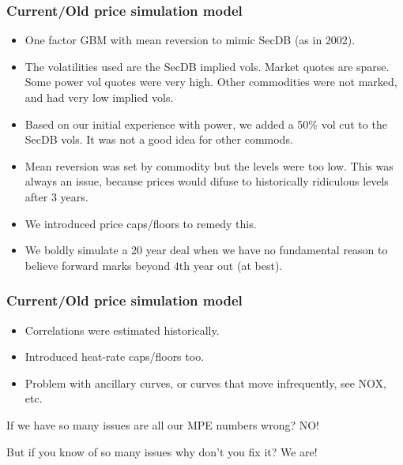 \documentclass[10pt]{beamer}
\begin{document}
\frame
{
  \frametitle{Current/Old price simulation model}
\begin{itemize}
\item One factor GBM with mean reversion to mimic SecDB (as in 2002). 
\item The volatilities used are the SecDB implied vols. Market quotes 
  are sparse.  Some power vol quotes were very high.  Other
  commodities were not marked, and had very low implied vols.   
\item Based on our initial experience with power, we added a 50$\%$ vol
  cut to the SecDB vols.  It was not a good idea for other commods. 
\item Mean reversion was set by commodity but the levels were too
  low.  This was always an issue, because prices
  would difuse to historically ridiculous levels after 3 years. 
\item We introduced price caps/floors to remedy this.   
\item We boldly simulate a 20 year deal when we have no fundamental
  reason to believe forward marks beyond 4th year out (at best). 
\end{itemize}
}

\frame
{
  \frametitle{Current/Old price simulation model}
\begin{itemize}
\item Correlations were estimated historically. 
\item Introduced heat-rate caps/floors too. 
\item Problem with ancillary curves, or curves that move infrequently,
  see NOX, etc. 
\end{itemize}

{\Large If we have so many issues are all our MPE numbers wrong?  NO!} 

\vspace{\baselineskip}
{\Large But if you know of so many issues why don't you fix it? We are!} 
}

\end{document}
